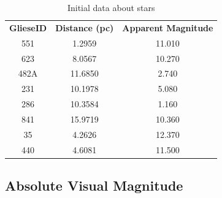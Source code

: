 \documentclass[a4paper,12pt]{article}
\begin{document}
  \begin{table}[h!]
    \begin{center}
    \caption{Initial data about stars}
    \begin{tabular}{c | c | c}
      \textbf{GlieseID} & \textbf{Distance (pc)} & \textbf{Apparent Magnitude} \\
      551 & 1.2959 & 11.010\\
      623 & 8.0567 & 10.270\\
      482A & 11.6850 & 2.740\\
      231 & 10.1978 & 5.080\\
      286 & 10.3584 & 1.160\\
      841 & 15.9719 & 10.360\\
      35 & 4.2626 & 12.370\\
      440 & 4.6081 & 11.500\\
    \end{tabular}
    \label{data}
  \end{center}
    \end{table}

\subsection{Absolute Visual Magnitude}

\begin{equation}
  \end{equation}

    


  
  \singlespacing
  \newpage
  \tiny
  \appendix
\end{document}
